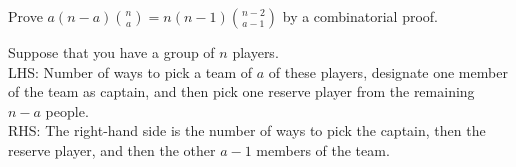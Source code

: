 \question Prove $a(n - a)\binom{n}{a} = n(n - 1)\binom{n - 2}{a - 1}$ 
by a combinatorial proof.
\begin{solution}[2cm]
Suppose that you have a group of $n$ players. \\
LHS: Number of ways to pick a team of $a$ of these players, designate 
one member of the team as captain, and then pick one reserve player 
from the remaining $n - a$ people. \\
RHS: The right-hand side is the number of ways to pick the captain, then the reserve player, and then the 
other $a - 1$ members of the team.
\end{solution}